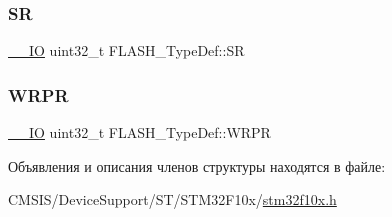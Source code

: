 \mbox{\label{struct_f_l_a_s_h___type_def_a52c4943c64904227a559bf6f14ce4de6}} 
\subsubsection{\texorpdfstring{SR}{SR}}
{\footnotesize\ttfamily \mbox{\hyperlink{group___c_m_s_i_s___c_m3__core__definitions_gaec43007d9998a0a0e01faede4133d6be}{\+\_\+\+\_\+\+IO}} uint32\+\_\+t F\+L\+A\+S\+H\+\_\+\+Type\+Def\+::\+SR}

\mbox{\label{struct_f_l_a_s_h___type_def_ac1889c0e17d868ab991f267ceb9dbb4b}} 
\subsubsection{\texorpdfstring{WRPR}{WRPR}}
{\footnotesize\ttfamily \mbox{\hyperlink{group___c_m_s_i_s___c_m3__core__definitions_gaec43007d9998a0a0e01faede4133d6be}{\+\_\+\+\_\+\+IO}} uint32\+\_\+t F\+L\+A\+S\+H\+\_\+\+Type\+Def\+::\+W\+R\+PR}



Объявления и описания членов структуры находятся в файле\+:\begin{DoxyCompactItemize}
\item 
C\+M\+S\+I\+S/\+Device\+Support/\+S\+T/\+S\+T\+M32\+F10x/\mbox{\hyperlink{stm32f10x_8h}{stm32f10x.\+h}}\end{DoxyCompactItemize}
